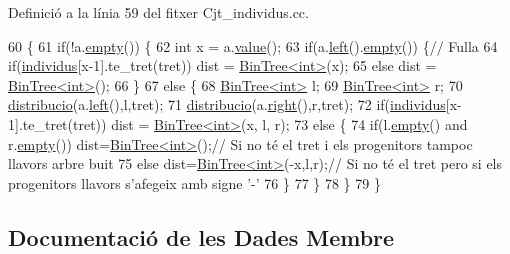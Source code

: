 Definició a la línia 59 del fitxer Cjt\+\_\+individus.\+cc.


\begin{DoxyCode}
60 \{
61   \textcolor{keywordflow}{if}(!a.\hyperlink{class_bin_tree_a9ca8d7ae95b9bed51eb43f30c8d2bd58}{empty}()) \{
62     \textcolor{keywordtype}{int} x = a.\hyperlink{class_bin_tree_af545517333e94fdbfccfbc7df7d961fe}{value}();
63     \textcolor{keywordflow}{if}(a.\hyperlink{class_bin_tree_a781025fb1c3693e91e851d55b181bedd}{left}().\hyperlink{class_bin_tree_a9ca8d7ae95b9bed51eb43f30c8d2bd58}{empty}()) \{\textcolor{comment}{// Fulla}
64       \textcolor{keywordflow}{if}(\hyperlink{class_cjt__individus_aa28716121e4fbc5b6a90150748c9fc0b}{individus}[x-1].te\_tret(tret)) dist = \hyperlink{class_bin_tree}{BinTree<int>}(x);
65       \textcolor{keywordflow}{else} dist = \hyperlink{class_bin_tree}{BinTree<int>}();
66     \}
67     \textcolor{keywordflow}{else} \{
68       \hyperlink{class_bin_tree}{BinTree<int>} l;
69       \hyperlink{class_bin_tree}{BinTree<int>} r;
70       \hyperlink{class_cjt__individus_a569a1232f6660f888176cacd07df134a}{distribucio}(a.\hyperlink{class_bin_tree_a781025fb1c3693e91e851d55b181bedd}{left}(),l,tret);
71       \hyperlink{class_cjt__individus_a569a1232f6660f888176cacd07df134a}{distribucio}(a.\hyperlink{class_bin_tree_a009c4bb95a25a1b639da637de32101ce}{right}(),r,tret);
72       \textcolor{keywordflow}{if}(\hyperlink{class_cjt__individus_aa28716121e4fbc5b6a90150748c9fc0b}{individus}[x-1].te\_tret(tret)) dist = \hyperlink{class_bin_tree}{BinTree<int>}(x, l, r);
73       \textcolor{keywordflow}{else} \{
74         \textcolor{keywordflow}{if}(l.\hyperlink{class_bin_tree_a9ca8d7ae95b9bed51eb43f30c8d2bd58}{empty}() and r.\hyperlink{class_bin_tree_a9ca8d7ae95b9bed51eb43f30c8d2bd58}{empty}()) dist=\hyperlink{class_bin_tree}{BinTree<int>}();\textcolor{comment}{// Si no té el tret i els
       progenitors tampoc llavors arbre buit}
75         \textcolor{keywordflow}{else} dist=\hyperlink{class_bin_tree}{BinTree<int>}(-x,l,r);\textcolor{comment}{// Si no té el tret pero si els progenitors llavors
       s'afegeix amb signe '-'}
76       \}
77     \}
78   \}
79 \}
\end{DoxyCode}


\subsection{Documentació de les Dades Membre}
